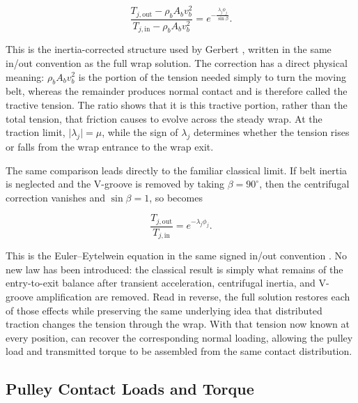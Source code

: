 \documentclass[11pt]{report}
\numberwithin{equation}{section}
\begin{document}
\begin{equation}
    \frac{
        T_{j,\mathrm{out}}-\rho_bA_bv_b^2
    }{
        T_{j,\mathrm{in}}-\rho_bA_bv_b^2
    }
    =
    e^{-\frac{\lambda_j\phi_j}{\sin\beta}}.
    \label{eq:gerbert_inertia_corrected_relation}
\end{equation}

This is the inertia-corrected structure used by Gerbert
\citep{Gerbert1996}, written in the same in/out convention as the full wrap
solution. The correction has a direct physical meaning:
\(\rho_bA_bv_b^2\) is the portion of the tension needed simply to turn the
moving belt, whereas the remainder produces normal contact and is therefore
called the tractive tension. The ratio shows that it is this tractive portion,
rather than the total tension, that friction causes to evolve across the steady
wrap. At the traction limit, \(\lvert\lambda_j\rvert=\mu\), while the sign of
\(\lambda_j\) determines whether the tension rises or falls from the wrap
entrance to the wrap exit.

The same comparison leads directly to the familiar classical limit. If belt
inertia is neglected and the V-groove is removed by taking
\(\beta=90^\circ\), then the centrifugal correction vanishes and
\(\sin\beta=1\), so  becomes

\begin{equation}
    \frac{T_{j,\mathrm{out}}}{T_{j,\mathrm{in}}}
    =
    e^{-\lambda_j\phi_j}.
    \label{eq:euler_eytelwein_relation}
\end{equation}

This is the Euler--Eytelwein equation in the same signed in/out convention
\citep{Euler1769,Eytelwein1808}. No new law has been introduced: the classical
result is simply what remains of the entry-to-exit balance after transient
acceleration, centrifugal inertia, and V-groove amplification are removed.
Read in reverse, the full solution restores each of those effects while
preserving the same underlying idea that distributed traction changes the
tension through the wrap. With that tension now known at every position,
 can recover the corresponding normal loading,
allowing the pulley load and transmitted torque to be assembled from the same
contact distribution.

\subsection{Pulley Contact Loads and Torque}
\label{sec:pulley_contact_loads_torque}
\end{document}

